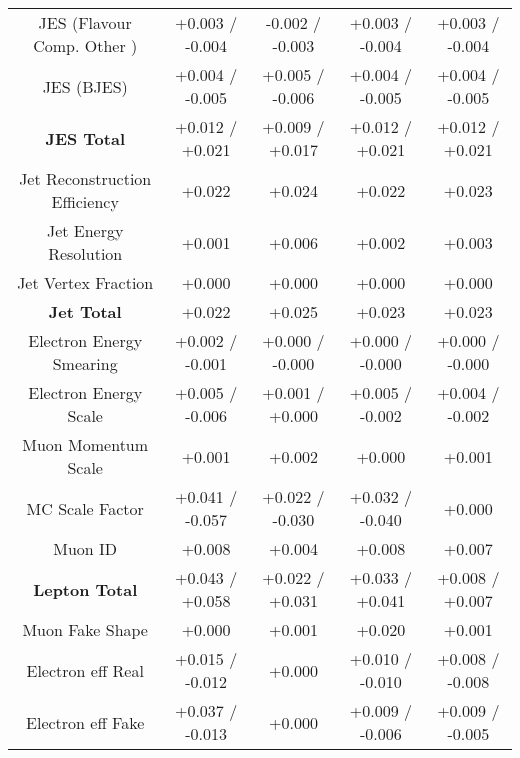 \begin{table}[htbp]
\begin{center}
\begin{tabular}{|c|c|c|c|c|}
 JES (Flavour Comp. Other )            &+0.003   / -0.004   & -0.002   / -0.003   & +0.003   / -0.004   & +0.003   / -0.004  \\
 JES (BJES)                            &+0.004   / -0.005   & +0.005   / -0.006   & +0.004   / -0.005   & +0.004   / -0.005  \\
 \hline
 \textbf{JES Total}                    &+0.012   / +0.021   & +0.009   / +0.017   & +0.012   / +0.021   & +0.012   / +0.021  \\
 \hline
 Jet Reconstruction Efficiency         &+0.022              & +0.024              & +0.022              & +0.023             \\
 Jet Energy Resolution                 &+0.001              & +0.006              & +0.002              & +0.003             \\
 Jet Vertex Fraction                   &+0.000              & +0.000              & +0.000              & +0.000             \\
 \hline
 \textbf{Jet Total}                    &+0.022              & +0.025              & +0.023              & +0.023             \\
 \hline
 Electron Energy Smearing              &+0.002   / -0.001   & +0.000   / -0.000   & +0.000   / -0.000   & +0.000   / -0.000  \\
 Electron Energy Scale                 &+0.005   / -0.006   & +0.001   / +0.000   & +0.005   / -0.002   & +0.004   / -0.002  \\
 Muon Momentum Scale                   &+0.001              & +0.002              & +0.000              & +0.001             \\
 MC Scale Factor                       &+0.041   / -0.057   & +0.022   / -0.030   & +0.032   / -0.040   & +0.000             \\
 Muon ID                               &+0.008              & +0.004              & +0.008              & +0.007             \\
 \hline
 \textbf{Lepton Total}                 &+0.043   / +0.058   & +0.022   / +0.031   & +0.033   / +0.041   & +0.008   / +0.007  \\
 \hline
 Muon Fake Shape                       &+0.000              & +0.001              & +0.020              & +0.001             \\
 Electron eff Real                     &+0.015   / -0.012   & +0.000              & +0.010   / -0.010   & +0.008   / -0.008  \\
 Electron eff Fake                     &+0.037   / -0.013   & +0.000              & +0.009   / -0.006   & +0.009   / -0.005  \\

\end{tabular}
\end{center}
\end{table}
